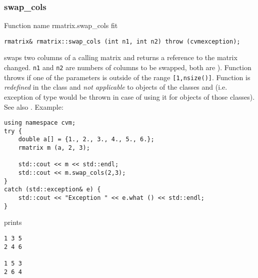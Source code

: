 \subsubsection{swap\_cols}
Function%
\pdfdest name {rmatrix.swap_cols} fit
\begin{verbatim}
rmatrix& rmatrix::swap_cols (int n1, int n2) throw (cvmexception);
\end{verbatim}
swaps two columns of a calling matrix and returns a reference to
the matrix changed. \verb"n1" and \verb"n2" are
 numbers of columns to be swapped,
both are \Based).
Function throws  
if one of the parameters is outside of the range
\verb"[1,nsize()]".
Function is \emph{redefined} in  the class
 and
\emph{not applicable} to objects of the classes
 and
 (i.e. exception of
type  would be thrown
in case of using it for objects of those classes).
See also .
Example:
\begin{Verbatim}
using namespace cvm;
try {
    double a[] = {1., 2., 3., 4., 5., 6.};
    rmatrix m (a, 2, 3);

    std::cout << m << std::endl;
    std::cout << m.swap_cols(2,3);
}
catch (std::exception& e) {
    std::cout << "Exception " << e.what () << std::endl;
}
\end{Verbatim}
prints
\begin{Verbatim}
1 3 5
2 4 6

1 5 3
2 6 4
\end{Verbatim}
\newpage




